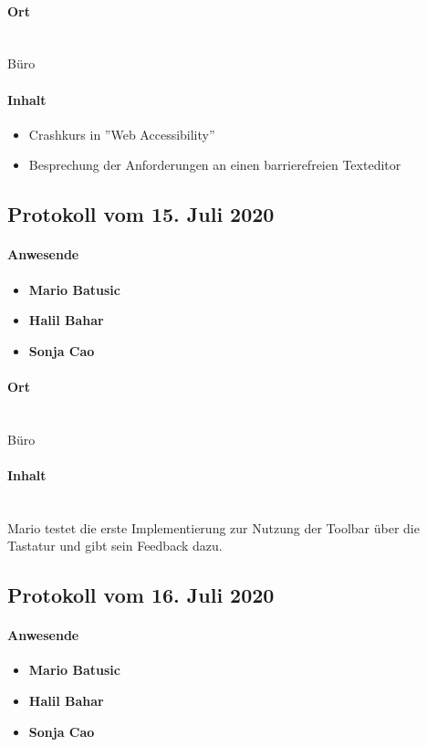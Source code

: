 \paragraph{Ort}\mbox{}\\
Büro

\paragraph{Inhalt}
\begin{itemize}
	\item Crashkurs in ''Web Accessibility''
	\item Besprechung der Anforderungen an einen barrierefreien Texteditor
\end{itemize}

\subsection{Protokoll vom 15. Juli 2020}
\paragraph{Anwesende}
\begin{itemize}
	\item{\textbf{Mario Batusic}}
	\item{\textbf{Halil Bahar}}
	\item{\textbf{Sonja Cao}}
\end{itemize}

\paragraph{Ort}\mbox{}\\
Büro

\paragraph{Inhalt}\mbox{}\\
Mario testet die erste Implementierung zur Nutzung der Toolbar über die Tastatur und gibt sein Feedback dazu.

\subsection{Protokoll vom 16. Juli 2020}
\paragraph{Anwesende}
\begin{itemize}
	\item{\textbf{Mario Batusic}}
	\item{\textbf{Halil Bahar}}
	\item{\textbf{Sonja Cao}}
\end{itemize}

